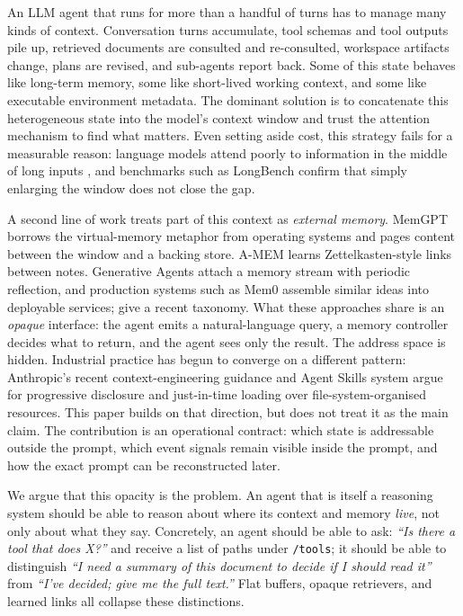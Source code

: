 
An LLM agent that runs for more than a handful of turns has to manage
many kinds of context. Conversation turns accumulate, tool schemas and
tool outputs pile up, retrieved documents are consulted and
re-consulted, workspace artifacts change, plans are revised, and
sub-agents report back. Some of this state behaves like long-term
memory, some like short-lived working context, and some like executable
environment metadata. The dominant solution is to concatenate this
heterogeneous state into the model's context window and trust the
attention mechanism to find what matters.
Even setting aside cost, this strategy fails for a measurable reason:
language models attend poorly to information in the middle of long
inputs \citep{liu2024lostmiddle}, and benchmarks such as LongBench
\citep{bai2024longbench} confirm that simply enlarging the window does
not close the gap.

A second line of work treats part of this context as \emph{external
memory}.
MemGPT \citep{packer2023memgpt} borrows the virtual-memory metaphor
from operating systems and pages content between the window and a
backing store. A-MEM \citep{xu2025amem} learns Zettelkasten-style
links between notes. Generative Agents \citep{park2023generative}
attach a memory stream with periodic reflection, and production
systems such as Mem0 \citep{chhikara2025mem0} assemble similar ideas
into deployable services; \citet{zhang2025memorysurvey} give a recent
taxonomy. What these approaches share is an \emph{opaque} interface:
the agent emits a natural-language query, a memory controller decides
what to return, and the agent sees only the result. The address
space is hidden. Industrial practice has begun to converge on a
different pattern: Anthropic's recent context-engineering guidance
\citep{anthropic2025contexteng} and Agent Skills system
\citep{anthropic2025skills} argue for progressive disclosure and
just-in-time loading over file-system-organised resources. This
paper builds on that direction, but does not treat it as the main
claim. The contribution is an operational contract: which state is
addressable outside the prompt, which event signals remain visible
inside the prompt, and how the exact prompt can be reconstructed later.

We argue that this opacity is the problem. An agent that is itself a
reasoning system should be able to reason about where its context and
memory \emph{live}, not only about what they say. Concretely, an agent
should be able to ask: \emph{``Is there a tool that does X?''} and
receive a list of paths under \texttt{/tools}; it should be able to
distinguish \emph{``I need a summary of this document to decide if I
should read it''} from \emph{``I've decided; give me the full text.''}
Flat buffers, opaque retrievers, and learned links all collapse these
distinctions.

